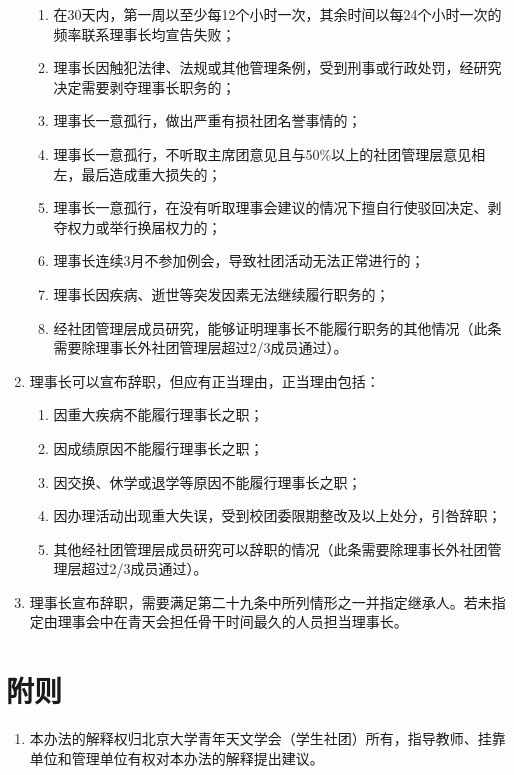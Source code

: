 \begin{enumerate}[resume]
    \begin{enumerate}
        \item 在30天内，第一周以至少每12个小时一次，其余时间以每24个小时一次的频率联系理事长均宣告失败；
        \item 理事长因触犯法律、法规或其他管理条例，受到刑事或行政处罚，经研究决定需要剥夺理事长职务的；
        \item 理事长一意孤行，做出严重有损社团名誉事情的；
        \item 理事长一意孤行，不听取主席团意见且与50\%以上的社团管理层意见相左，最后造成重大损失的；
        \item 理事长一意孤行，在没有听取理事会建议的情况下擅自行使驳回决定、剥夺权力或举行换届权力的；
        \item 理事长连续3月不参加例会，导致社团活动无法正常进行的；
        \item 理事长因疾病、逝世等突发因素无法继续履行职务的；
        \item 经社团管理层成员研究，能够证明理事长不能履行职务的其他情况（此条需要除理事长外社团管理层超过2/3成员通过）。
    \end{enumerate}
    
    \item 理事长可以宣布辞职，但应有正当理由，正当理由包括：
    
    \begin{enumerate}
        \item 因重大疾病不能履行理事长之职；
        \item 因成绩原因不能履行理事长之职；
        \item 因交换、休学或退学等原因不能履行理事长之职；
        \item 因办理活动出现重大失误，受到校团委限期整改及以上处分，引咎辞职；
        \item 其他经社团管理层成员研究可以辞职的情况（此条需要除理事长外社团管理层超过2/3成员通过）。
    \end{enumerate}

    \item 理事长宣布辞职，需要满足第二十九条中所列情形之一并指定继承人。若未指定由理事会中在青天会担任骨干时间最久的人员担当理事长。
\end{enumerate}

\section{附则}

\begin{enumerate}[resume]
    \item 本办法的解释权归北京大学青年天文学会（学生社团）所有，指导教师、挂靠单位和管理单位有权对本办法的解释提出建议。
\end{enumerate}

